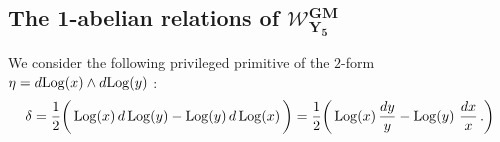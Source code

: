 \documentclass[11pt]{amsart}
\begin{document}
\subsection{\bf The  1-abelian relations of $\boldsymbol{{\mathcal W}^{GM}_{ \boldsymbol{Y}_5}}$}
\label{SS:1-AR-of-WGMY5}
%
%
%
%
%
We consider the following privileged primitive of the $2$-form $\eta= d{\rm Log}(x)\wedge d{\rm Log}(y) $ : 
\begin{equation}
\label{Eq:delta}
\delta = %
 \frac{1}{2}\bigg(\,  
{\rm Log}(x)\, d\,{\rm Log}(y)-{\rm Log}(y)\,d\,{\rm Log}(x)\, 
\bigg) 
=
 \frac{1}{2}\bigg(\,  
{\rm Log}(x)\, \frac{dy}{y}-{\rm Log}(y)\,\, \frac{dx}{x}\, .
\bigg) 
\end{equation}
\end{document}
